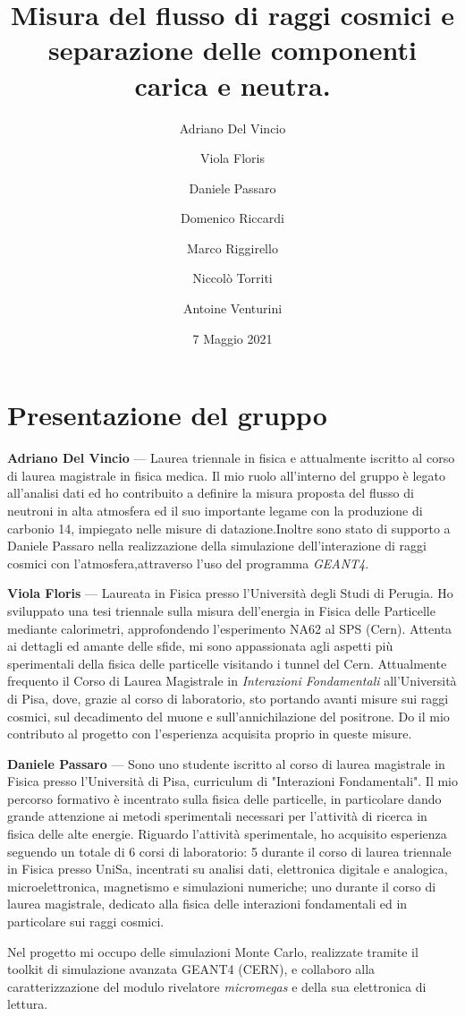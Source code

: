 \documentclass[twocolumn, a4paper]{article}
\title{Misura del flusso di raggi cosmici e separazione delle componenti carica e neutra.}
\author{Adriano Del Vincio \and Viola Floris \and Daniele Passaro \and Domenico Riccardi \and Marco Riggirello
\and
Niccolò Torriti \and Antoine Venturini}
\date{7 Maggio 2021}
\newenvironment{crewbio}[1]{\noindent\textbf{#1} ---}{\\}
\begin{document}
\maketitle
\section{Presentazione del gruppo}

\begin{crewbio}{Adriano Del Vincio}
Laurea triennale in fisica e attualmente iscritto al corso di laurea magistrale in fisica medica. Il mio ruolo all'interno del gruppo è legato all'analisi dati ed ho contribuito a definire la misura proposta del flusso di neutroni in alta atmosfera ed il suo importante legame con la produzione di carbonio 14, impiegato nelle misure di datazione.Inoltre sono stato di supporto a Daniele Passaro nella realizzazione della simulazione dell'interazione di raggi cosmici con l'atmosfera,attraverso l'uso del programma \emph{GEANT4}. 
\end{crewbio}

\begin{crewbio}{Viola Floris}
Laureata in Fisica presso l'Università degli Studi di Perugia. Ho sviluppato una tesi triennale sulla misura dell'energia in Fisica delle Particelle mediante calorimetri, approfondendo l'esperimento NA62 al SPS (Cern). Attenta ai dettagli ed amante delle sfide, mi sono appassionata agli aspetti più sperimentali della fisica delle particelle visitando i tunnel del Cern. Attualmente frequento il Corso di Laurea Magistrale in \emph{Interazioni Fondamentali} all'Università di Pisa, dove, grazie al corso di laboratorio, sto portando avanti misure sui raggi cosmici, sul decadimento del muone e sull'annichilazione del positrone. Do il mio contributo al progetto con l'esperienza acquisita proprio in queste misure.
\end{crewbio}

\begin{crewbio}{Daniele Passaro}
Sono uno studente iscritto al corso di laurea magistrale in Fisica presso l'Università di Pisa, curriculum di  "Interazioni Fondamentali". 
Il mio percorso formativo è incentrato sulla fisica delle particelle, in particolare dando grande attenzione ai metodi sperimentali necessari per l'attività di ricerca in fisica delle alte energie. Riguardo l'attività sperimentale, ho acquisito esperienza seguendo un totale di 6 corsi di laboratorio: 5 durante il corso di laurea triennale in Fisica presso UniSa, incentrati su analisi dati, elettronica digitale e analogica, microelettronica, magnetismo e simulazioni numeriche; uno durante il corso di laurea magistrale, dedicato alla fisica delle interazioni fondamentali ed in particolare sui raggi cosmici.

Nel progetto mi occupo delle simulazioni Monte Carlo, realizzate tramite il toolkit di simulazione avanzata GEANT4 (\textcopyright CERN), e collaboro alla caratterizzazione del modulo rivelatore \emph{micromegas} e della sua elettronica di lettura. 
\end{crewbio}
\end{document}
